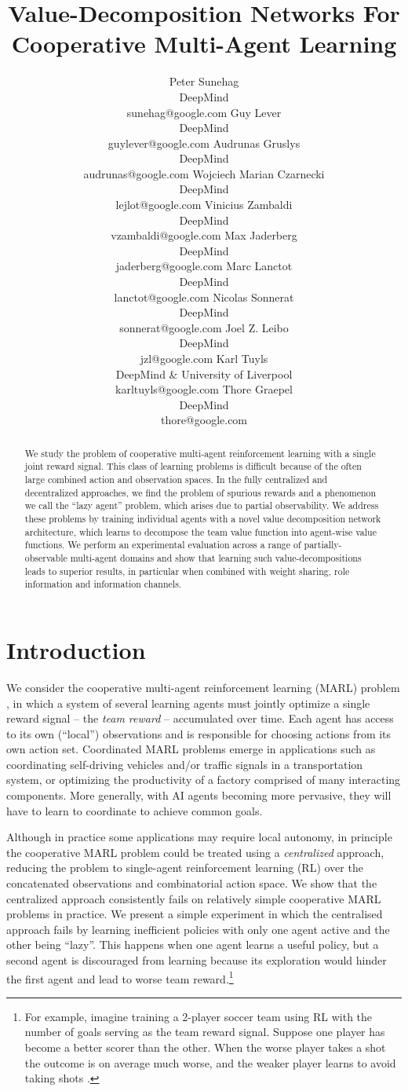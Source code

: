 \documentclass{article}
\title{Value-Decomposition Networks For Cooperative Multi-Agent Learning}
\author{
  Peter Sunehag\\DeepMind\\sunehag@google.com \And Guy Lever\\DeepMind\\guylever@google.com \And Audrunas Gruslys\\DeepMind\\audrunas@google.com \And Wojciech Marian Czarnecki\\DeepMind\\lejlot@google.com \And Vinicius Zambaldi\\DeepMind\\vzambaldi@google.com
  \And Max Jaderberg\\DeepMind\\jaderberg@google.com \And Marc Lanctot\\DeepMind\\lanctot@google.com \And Nicolas Sonnerat\\DeepMind\\sonnerat@google.com \And Joel Z. Leibo\\DeepMind\\jzl@google.com \And Karl Tuyls\\DeepMind \& University of Liverpool\\karltuyls@google.com \And Thore Graepel\\DeepMind\\thore@google.com 
}
\begin{document}
\maketitle

\begin{abstract}
We study the problem of cooperative multi-agent reinforcement learning with a single joint reward signal. This class of learning problems is difficult because of the often large combined action and observation spaces. In the fully centralized and decentralized approaches, we find the problem of spurious rewards and a phenomenon we call the ``lazy agent'' problem, which arises due to partial observability.  We  address these problems by training individual agents with a novel value decomposition network architecture, which learns to decompose the team value function into  agent-wise value functions. We perform an experimental evaluation across a range of partially-observable multi-agent domains and show that learning such value-decompositions leads to superior results, in particular when combined with weight sharing, role information and information channels. 
\end{abstract}


\section{Introduction}


We consider the cooperative multi-agent reinforcement learning (MARL) problem \citep{panait05,Busoniu08MARL,TuylsW12}, in which a system of several learning agents must jointly optimize a single reward signal -- the \emph{team reward} -- accumulated over time. Each agent has access to its own (``local'') observations and is responsible for choosing actions from its own action set. Coordinated MARL problems emerge in applications such as coordinating self-driving vehicles and/or traffic signals in a transportation system, or optimizing the productivity of a factory comprised of many interacting components. More generally, with AI agents becoming more pervasive, they will have to learn to coordinate to achieve common goals.

Although in practice some applications may require local autonomy, in principle the cooperative MARL problem could be treated using a \emph{centralized} approach, reducing the problem to single-agent reinforcement learning (RL) over the concatenated observations and combinatorial action space. We show that the centralized approach consistently fails on relatively simple cooperative MARL problems in practice. We  present a simple experiment in which the centralised approach fails by learning inefficient policies with only one agent active and the other being ``lazy''. This happens when one agent learns a useful policy, but a second agent is discouraged from learning because its exploration would hinder the first agent and lead to worse team reward.\footnote{For example, imagine training a 2-player soccer team using RL with the number of goals serving as the team reward signal. Suppose one player has become a better scorer than the other. When the worse player takes a shot the outcome is on average much worse, and the weaker player learns to avoid taking shots \citep{HausknechtThesis}.} 
\end{document}
